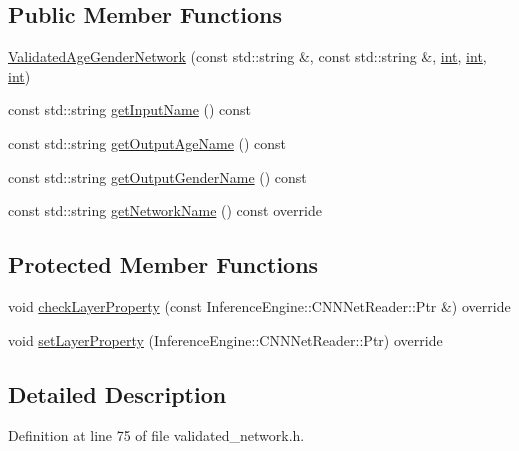 \subsection*{Public Member Functions}
\begin{DoxyCompactItemize}
\item 
\hyperlink{classValidatedAgeGenderNetwork_af6c027d586117ea2bafcfde993ad0790}{Validated\+Age\+Gender\+Network} (const std\+::string \&, const std\+::string \&, \hyperlink{CMakeCache_8txt_a79a3d8790b2588b09777910863574e09}{int}, \hyperlink{CMakeCache_8txt_a79a3d8790b2588b09777910863574e09}{int}, \hyperlink{CMakeCache_8txt_a79a3d8790b2588b09777910863574e09}{int})
\item 
const std\+::string \hyperlink{classValidatedAgeGenderNetwork_a1033508252d400f8d36f3dde3988a155}{get\+Input\+Name} () const 
\item 
const std\+::string \hyperlink{classValidatedAgeGenderNetwork_a2ae9f6eb3fe23d1f3b17048beea0c55e}{get\+Output\+Age\+Name} () const 
\item 
const std\+::string \hyperlink{classValidatedAgeGenderNetwork_a713c57be92177d5bbe3a64e2e15ead0e}{get\+Output\+Gender\+Name} () const 
\item 
const std\+::string \hyperlink{classValidatedAgeGenderNetwork_ab53dec40a82af2d061a4976f686a42f5}{get\+Network\+Name} () const override
\end{DoxyCompactItemize}
\subsection*{Protected Member Functions}
\begin{DoxyCompactItemize}
\item 
void \hyperlink{classValidatedAgeGenderNetwork_ab44a374f2d35331b3ff4d396570e3120}{check\+Layer\+Property} (const Inference\+Engine\+::\+C\+N\+N\+Net\+Reader\+::\+Ptr \&) override
\item 
void \hyperlink{classValidatedAgeGenderNetwork_a5c39aa39e7cc3abf984a29bdf9e61d47}{set\+Layer\+Property} (Inference\+Engine\+::\+C\+N\+N\+Net\+Reader\+::\+Ptr) override
\end{DoxyCompactItemize}


\subsection{Detailed Description}


Definition at line 75 of file validated\+\_\+network.\+h.



